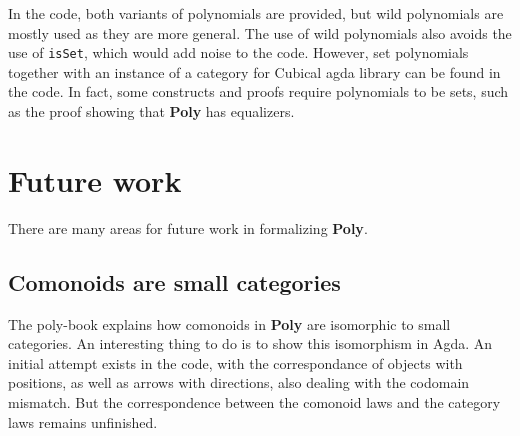 In the code, both variants of polynomials are provided, but wild polynomials are mostly used as they are more general. The use of wild polynomials also avoids the use of \texttt{isSet}, which would add noise to the code. However, set polynomials together with an instance of a category for Cubical agda library can be found in the code. In fact, some constructs and proofs require polynomials to be sets, such as the proof showing that \textbf{Poly} has equalizers.






\section{Future work}
There are many areas for future work in formalizing \textbf{Poly}. 

\subsection{Comonoids are small categories}
The poly-book explains how comonoids in \textbf{Poly} are isomorphic to small categories. An interesting thing to do is to show this isomorphism in Agda. An initial attempt exists in the code, with the correspondance of objects with positions, as well as arrows with directions, also dealing with the codomain mismatch. But the correspondence between the comonoid laws and the category laws remains unfinished.

